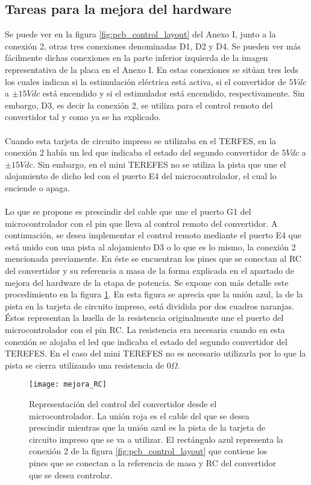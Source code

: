 \subsection{Tareas para la mejora del hardware}
Se puede ver en la figura \ref{fig:pcb_control_layout} del Anexo I, junto a la conexión 2, otras tres conexiones denominadas D1, D2 y D4. Se pueden ver más fácilmente dichas conexiones en la parte inferior izquierda de la imagen representativa de la placa en el Anexo I. En estas conexiones se sitúan tres leds los cuales indican si la estimulación eléctrica está activa, si el convertidor de $5Vdc$ a $\pm15Vdc$ está encendido y si el estimulador está encendido, respectivamente. Sin embargo, D3, es decir la conexión 2, se utiliza para el control remoto del convertidor tal y como ya se ha explicado.
\\
\\
Cuando esta tarjeta de circuito impreso se utilizaba en el TERFES, en la conexión 2 había un led que indicaba el estado del segundo convertidor de $5Vdc$ a $\pm15Vdc$. Sin embargo, en el mini TEREFES no se utiliza la pista que une el alojamiento de dicho led con el puerto E4 del microcontrolador, el cual lo enciende o apaga.
\\
\\
Lo que se propone es prescindir del cable que une el puerto G1 del microcontrolador con el pin que lleva al control remoto del convertidor. A continuación, se desea implementar el control remoto mediante el puerto E4 que está unido con una pista al alojamiento D3 o lo que es lo mismo, la conexión 2 mencionada previamente. En éste se encuentran los pines que se conectan al RC del convertidor y su referencia a masa de la forma explicada en el apartado de mejora del hardware de la etapa de potencia. Se expone con más detalle este procedimiento en la figura \ref{fig:mejora_RC}. En esta figura se aprecia que la unión azul, la de la pista en la tarjeta de circuito impreso, está dividida por dos cuadros naranjas. Éstos representan la huella de la resistencia originalmente une el puerto del microcontrolador con el pin RC. La resistencia era necesaria cuando en esta conexión se alojaba el led que indicaba el estado del segundo convertidor del TEREFES. En el caso del mini TEREFES no es necesario utilizarla por lo que la pista se cierra utilizando una resistencia de $0\Omega$.\\

\begin{figure}[!htb]
\centering
\texttt{[image: mejora\_RC]}
  \caption{Representación del control del convertidor desde el microcontrolador. La unión roja es el cable del que se desea prescindir mientras que la unión azul es la pista de la tarjeta de circuito impreso que se va a utilizar. El rectángulo azul representa la conexión 2 de la figura \ref{fig:pcb_control_layout} que contiene los pines que se conectan a la referencia de masa y RC del convertidor que se desea controlar.}\label{fig:mejora_RC}
\end{figure}

